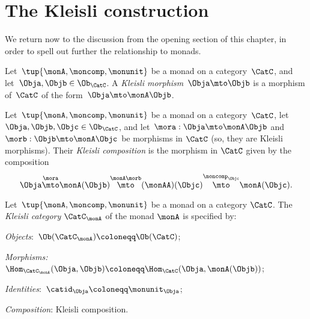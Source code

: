 

\section{The Kleisli construction}
\label{sec:Kleisli}

We return now to the discussion from the opening section of this chapter, in order to spell out further the relationship to monads.

\begin{ctdefinition}
    \label{def:kleislimor}
    Let~$\tup{\monA, \moncomp, \monunit}$ be a monad on a category~$\CatC$, and let~$\Obja, \Objb \in \Ob_\CatC$.
    A
    \emph{Kleisli morphism}~$\Obja \mto \Objb$ is a morphism of~$\CatC$ of the form~$\Obja \mto \monA \Objb$.
\end{ctdefinition}


\begin{ctdefinition}
    \label{def:kleislicomp}
    Let~$\tup{\monA, \moncomp, \monunit}$ be a monad on a category~$\CatC$, let~$\Obja, \Objb, \Objc \in \Ob_\CatC$,  and let~$\mora : \Obja \mto \monA \Objb$ and $\morb : \Objb \mto \monA \Objc$ be morphisms in $\CatC$ (so, they are Kleisli morphisms).
    Their \emph{Kleisli composition} is the morphism in $\CatC$ given by the composition
    \begin{equation}
        \Obja \overset{\mora}{\mto} \monA(\Objb) \overset{\monA \morb}{\mto} (\monAA)(\Objc) \overset{\moncomp_\Objc}{\mto} \monA(\Objc).
    \end{equation}
\end{ctdefinition}

\begin{ctdefinition}
    \label{def:kleislicat}
    Let~$\tup{\monA, \moncomp, \monunit}$ be a monad on a category $\CatC$.
    The \emph{Kleisli category} $\CatC_\monA$ of the monad $\monA$ is specified by:
    \begin{compactenum}
        \item \emph{Objects}:~$\Ob(\CatC_\monA) \coloneqq \Ob(\CatC)$;
        \item \emph{Morphisms:}~$\Hom_{\CatC_\monA}(\Obja, \Objb) \coloneqq \Hom_{\CatC}(\Obja, \monA(\Objb))$;
        \item \emph{Identities}:~$\catid_\Obja \coloneqq \monunit_\Obja$;
        \item \emph{Composition}: Kleisli composition.
    \end{compactenum}
\end{ctdefinition}


